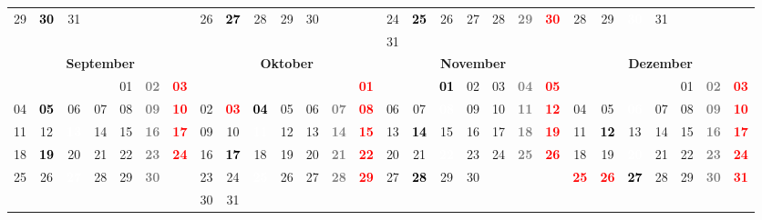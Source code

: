 \documentclass[10pt,a4paper,landscape]{article}
\newcommand{\yb}[1]{\cellcolor{yellow}\textcolor{black}{\bf #1}}
\newcommand{\iv}[1]{\cellcolor{black}\textcolor{white}{\bf #1}}
\newcommand{\rb}[1]{\textbf{\textcolor{red}{#1}}}
\newcommand{\hv}[1]{\textbf{\textcolor{Gray}{#1}}}
\begin{document}
\begin{tabular}{|ccccccc|ccccccc|ccccccc|ccccccc|}
29 & \yb{30} & 31 & & & & & 26 & \yb{27} & 28 & 29 & 30 & & & 24 & \yb{25} & 26 & 27 & 28 & \hv{29} & \rb{30} & 28 & 29 & \iv{30} & 31 & & &  \\
& & & & & & & & & & & & & & 31 & & & & & & & & & & & & &  \\
\hline
\multicolumn{7}{|c|}{\bf September} & \multicolumn{7}{|c|}{\bf Oktober} & \multicolumn{7}{|c|}{\bf November} & \multicolumn{7}{|c|}{\bf Dezember} \\
& & & & 01 & \hv{02} & \rb{03} & & & & & & & \rb{01} & & & \yb{01} & 02 & 03 & \hv{04} & \rb{05} & & & & & 01 & \hv{02} & \rb{03} \\
04 & \yb{05} & 06 & 07 & 08 & \hv{09} & \rb{10} & 02 & \rb{03} & \yb{04} & 05 & 06 & \hv{07} & \rb{08} & 06 & 07 & \iv{08} & 09 & 10 & \hv{11} & \rb{12} & 04 & 05 & \iv{06} & 07 & 08 & \hv{09} & \rb{10} \\
11 & 12 & \iv{13} & 14 & 15 & \hv{16} & \rb{17} & 09 & 10 & \iv{11} & 12 & 13 & \hv{14} & \rb{15} & 13 & \yb{14} & 15 & 16 & 17 & \hv{18} & \rb{19} & 11 & \yb{12} & 13 & 14 & 15 & \hv{16} & \rb{17} \\
18 & \yb{19} & 20 & 21 & 22 & \hv{23} & \rb{24} & 16 & \yb{17} & 18 & 19 & 20 & \hv{21} & \rb{22} & 20 & 21 & \iv{22} & 23 & 24 & \hv{25} & \rb{26} & 18 & 19 & \iv{20} & 21 & 22 & \hv{23} & \rb{24} \\
25 & 26 & \iv{27} & 28 & 29 & \hv{30} & & 23 & 24 & \iv{25} & 26 & 27 & \hv{28} & \rb{29} & 27 & \yb{28} & 29 & 30 & & & & \rb{25} & \rb{26} & \yb{27} & 28 & 29 & \hv{30} & \rb{31} \\
& & & & & & & 30 & 31 & & & & & & & & & & & & & & & & & & &  \\
\hline
\end{tabular}
\end{document}
